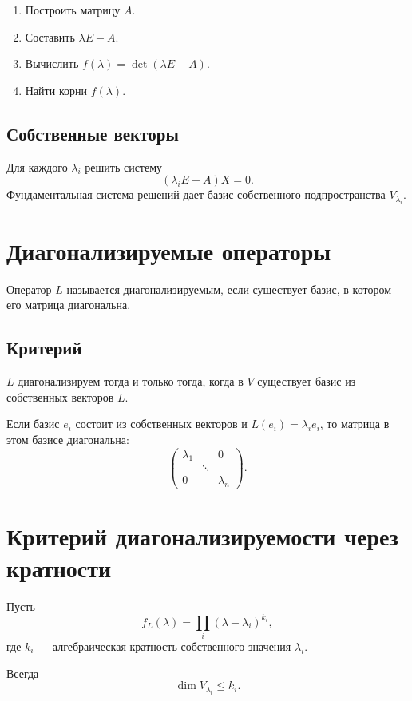 \documentclass[12pt,a4paper]{article}
\begin{document}
\begin{enumerate}
    \item Построить матрицу $A$.
    \item Составить $\lambda E-A$.
    \item Вычислить $f(\lambda)=\det(\lambda E-A)$.
    \item Найти корни $f(\lambda)$.
\end{enumerate}

\subsection*{Собственные векторы}

Для каждого $\lambda_i$ решить систему
\[
    (\lambda_iE-A)X=0.
\]
Фундаментальная система решений дает базис собственного подпространства $V_{\lambda_i}$.

\section{Диагонализируемые операторы}

Оператор $L$ называется диагонализируемым, если существует базис, в котором его матрица диагональна.

\subsection*{Критерий}

$L$ диагонализируем тогда и только тогда, когда в $V$ существует базис из собственных векторов $L$.

Если базис $e_i$ состоит из собственных векторов и $L(e_i)=\lambda_i e_i$, то матрица в этом базисе диагональна:
\[
    \begin{pmatrix}
        \lambda_1 & & 0\\
        & \ddots & \\
        0 & & \lambda_n
    \end{pmatrix}.
\]

\section{Критерий диагонализируемости через кратности}

Пусть
\[
    f_L(\lambda)=\prod_i(\lambda-\lambda_i)^{k_i},
\]
где $k_i$ --- алгебраическая кратность собственного значения $\lambda_i$.

Всегда
\[
    \dim V_{\lambda_i}\le k_i.
\]
\end{document}
